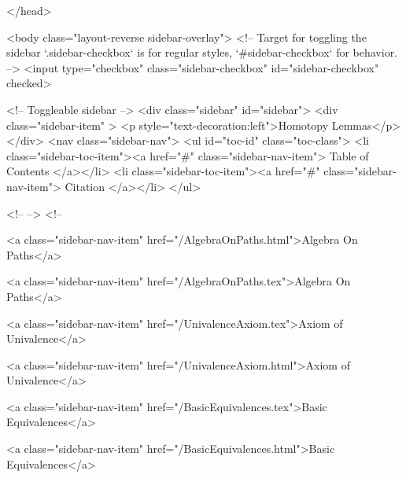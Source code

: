   
</head>




  <body class="layout-reverse sidebar-overlay">
    <!-- Target for toggling the sidebar `.sidebar-checkbox` is for regular
     styles, `#sidebar-checkbox` for behavior. -->
<input type="checkbox" class="sidebar-checkbox" id="sidebar-checkbox" checked>

<!-- Toggleable sidebar -->
<div class="sidebar" id="sidebar">
  <div class="sidebar-item" >
    <p style="text-decoration:left">Homotopy Lemmas</p>
  </div>
  <nav class="sidebar-nav">
    <ul id="toc-id" class="toc-class">
  <li class="sidebar-toc-item"><a href="#" class="sidebar-nav-item"> Table of Contents </a></li>
  <li class="sidebar-toc-item"><a href="#" class="sidebar-nav-item"> Citation </a></li>
</ul>


    <!--  -->
    <!-- 
      
    
      
    
      
    
      
    
      
        
      
    
      
        
          <a class="sidebar-nav-item" href="/AlgebraOnPaths.html">Algebra On Paths</a>
        
      
    
      
        
          <a class="sidebar-nav-item" href="/AlgebraOnPaths.tex">Algebra On Paths</a>
        
      
    
      
        
          <a class="sidebar-nav-item" href="/UnivalenceAxiom.tex">Axiom of Univalence</a>
        
      
    
      
        
          <a class="sidebar-nav-item" href="/UnivalenceAxiom.html">Axiom of Univalence</a>
        
      
    
      
        
          <a class="sidebar-nav-item" href="/BasicEquivalences.tex">Basic Equivalences</a>
        
      
    
      
        
          <a class="sidebar-nav-item" href="/BasicEquivalences.html">Basic Equivalences</a>
        
